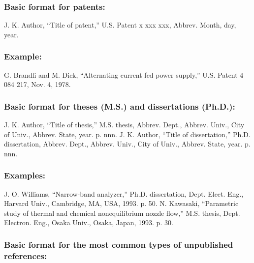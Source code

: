 \documentclass{IEEEoj}
\begin{document}
\subsubsection*{Basic format for patents:}

\begin{thebibliography}{00}
 J. K. Author, ``Title of patent,'' U.S. Patent {x xxx xxx}, Abbrev. Month, day, year.
\end{thebibliography}

\subsubsection*{Example:}

\begin{thebibliography}{00}
 G. Brandli and M. Dick, ``Alternating current fed power supply,'' U.S. Patent 4 084 217, Nov. 4, 1978.
\end{thebibliography}

\subsubsection*{Basic format for theses (M.S.) and dissertations (Ph.D.):}

\begin{thebibliography}{00}
 J. K. Author, ``Title of thesis,'' M.S. thesis, Abbrev. Dept., Abbrev.
Univ., City of Univ., Abbrev. State, year. p. nnn.
 J. K. Author, ``Title of dissertation,'' Ph.D. dissertation, Abbrev.
Dept., Abbrev. Univ., City of Univ., Abbrev. State, year. p. nnn.
\end{thebibliography}

\subsubsection*{Examples:}

\begin{thebibliography}{00}
 J. O. Williams, ``Narrow-band analyzer,'' Ph.D. dissertation, Dept. Elect. Eng., Harvard Univ., Cambridge, MA, USA, 1993. p. 50.
 N. Kawasaki, ``Parametric study of thermal and chemical nonequilibrium nozzle flow,'' M.S. thesis, Dept. Electron. Eng., Osaka Univ., Osaka, Japan, 1993. p. 30.
\end{thebibliography}

\subsubsection*{Basic format for the most common types of unpublished references:}
\end{document}
